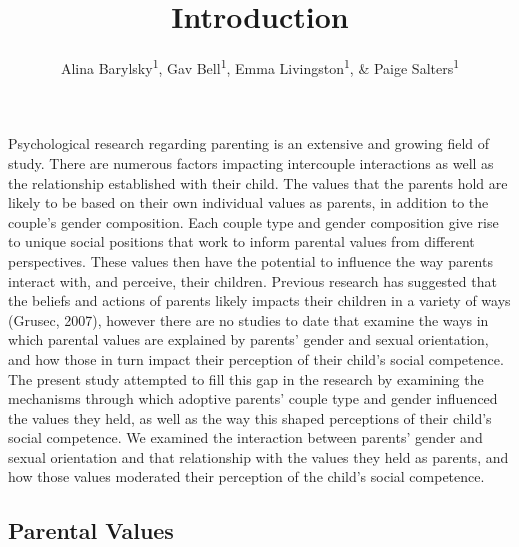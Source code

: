 \documentclass[man]{apa6}
\title{Introduction}
\author{Alina Barylsky\textsuperscript{1}, Gav Bell\textsuperscript{1}, Emma Livingston\textsuperscript{1}, \& Paige Salters\textsuperscript{1}}
\date{}
\affiliation{
\vspace{0.5cm}
\textsuperscript{1} Smith College}
\begin{document}
\maketitle

Psychological research regarding parenting is an extensive and growing field of study. There are numerous factors impacting intercouple interactions as well as the relationship established with their child. The values that the parents hold are likely to be based on their own individual values as parents, in addition to the couple's gender composition. Each couple type and gender composition give rise to unique social positions that work to inform parental values from different perspectives. These values then have the potential to influence the way parents interact with, and perceive, their children. Previous research has suggested that the beliefs and actions of parents likely impacts their children in a variety of ways (Grusec, 2007), however there are no studies to date that examine the ways in which parental values are explained by parents' gender and sexual orientation, and how those in turn impact their perception of their child's social competence. The present study attempted to fill this gap in the research by examining the mechanisms through which adoptive parents' couple type and gender influenced the values they held, as well as the way this shaped perceptions of their child's social competence. We examined the interaction between parents' gender and sexual orientation and that relationship with the values they held as parents, and how those values moderated their perception of the child's social competence.

\hypertarget{parental-values}{%
\subsection{Parental Values}\label{parental-values}}
\end{document}
